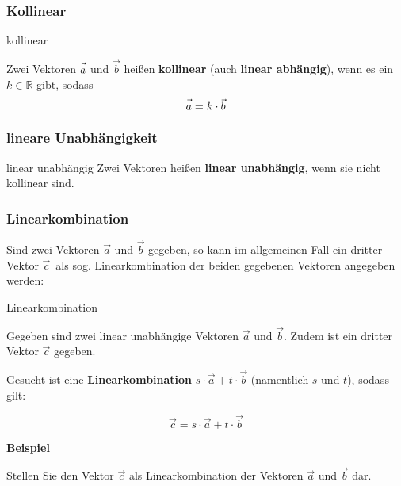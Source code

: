 \subsubsection{Kollinear}

\begin{definition}{kollinear}{}\label{linearkombination}

  Zwei Vektoren $\vec{a\vphantom{b}}$ und $\vec{b}$ heißen
  \textbf{kollinear} (auch \textbf{linear abhängig}), wenn es ein
  $k\in\mathbb{R}$ gibt, sodass
  $$\vec{a\vphantom{b}} = k\cdot{}\vec{b}$$
\end{definition}

\subsubsection{lineare Unabhängigkeit}
\begin{definition}{linear unabhängig}{}
Zwei Vektoren heißen \textbf{linear unabhängig}, wenn sie nicht
kollinear sind.
\end{definition}

\subsubsection{Linearkombination}
Sind zwei Vektoren $\vec{a}$ und $\vec{b}$ gegeben, so kann im
allgemeinen Fall ein
dritter Vektor $\vec{c}$\, als sog. Linearkombination der beiden
gegebenen Vektoren angegeben werden:

\begin{gesetz}{Linearkombination}{}

  Gegeben sind zwei linear unabhängige Vektoren $\vec{a}$ und
  $\vec{b}$. Zudem ist ein dritter Vektor $\vec{c}$ gegeben.

  Gesucht ist eine \textbf{Linearkombination} $s\cdot{}\vec{a} +
  t\cdot{}\vec{b}$ (namentlich $s$ und $t$), sodass gilt:

  $$\vec{c} = s\cdot{}\vec{a} + t\cdot{}\vec{b}$$
\end{gesetz}
\newpage


\textbf{Beispiel}

Stellen Sie den Vektor $\vec{c}$ als Linearkombination der Vektoren
$\vec{a}$ und $\vec{b}$ dar.

